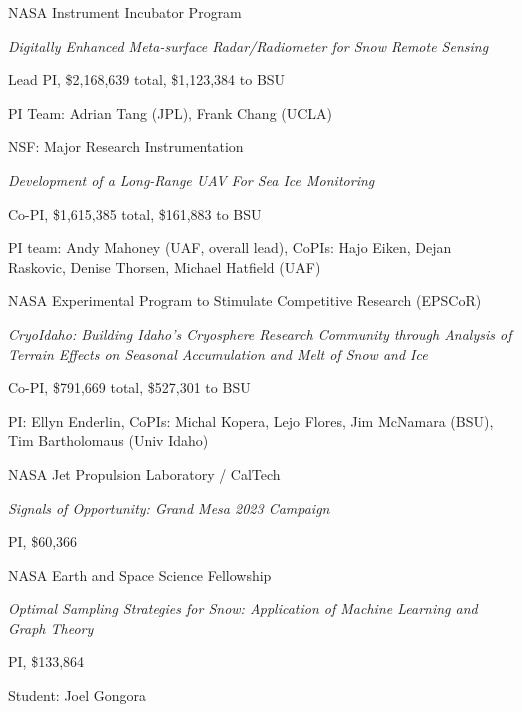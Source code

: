 \documentclass[11pt]{article}
\renewenvironment{itemize}{
  \begin{list}{}{
    \setlength{\leftmargin}{1.5em}
    \setlength{\itemsep}{0pt}
    \setlength{\parskip}{0pt}
  }
}{
  \end{list}
}
\begin{document}
\begin{itemize}
\item[2/2020-1/2023] NASA Instrument Incubator Program
\begin{itemize}
\item \textit{Digitally Enhanced Meta-surface Radar/Radiometer for Snow Remote Sensing}
\item Lead PI, \$2,168,639 total, \$1,123,384 to BSU
\item PI Team: Adrian Tang (JPL), Frank Chang (UCLA)
\end{itemize}

\pagebreak

\item[9/2018-8/2022] NSF: Major Research Instrumentation
\begin{itemize}
  \item \textit{Development of a Long-Range UAV For Sea Ice Monitoring}
  \item Co-PI, \$1,615,385 total, \$161,883 to BSU
  \item PI team: Andy Mahoney (UAF, overall lead),  CoPIs: Hajo Eiken, Dejan Raskovic,  Denise Thorsen, Michael Hatfield (UAF)
\end{itemize}

\item[1/2021-12/2023] NASA Experimental Program to Stimulate Competitive Research (EPSCoR)
\begin{itemize}
\item \textit{CryoIdaho: Building Idaho’s Cryosphere Research Community through Analysis of Terrain Effects on Seasonal Accumulation and Melt of Snow and Ice}
\item Co-PI, \$791,669 total, \$527,301 to BSU 
\item PI: Ellyn Enderlin, CoPIs: Michal Kopera, Lejo Flores, Jim McNamara (BSU), Tim Bartholomaus (Univ Idaho)
\end{itemize}

\item[1/2023-9/2023] NASA Jet Propulsion Laboratory / CalTech 
\begin{itemize}
\item \textit{Signals of Opportunity: Grand Mesa 2023 Campaign}
\item PI, \$60,366
\end{itemize}

\item[09/2018-8/2023] NASA Earth and Space Science Fellowship
\begin{itemize}
  \item \textit{Optimal Sampling Strategies for Snow: Application of Machine Learning and Graph Theory}
  \item PI, \$133,864 
  \item Student: Joel Gongora
\end{itemize}


\end{itemize}
\end{document}
